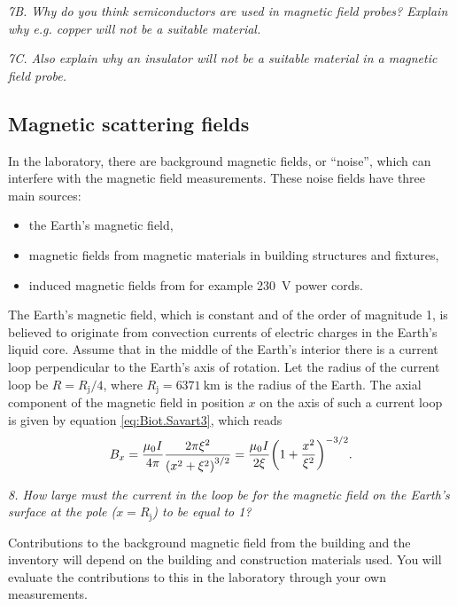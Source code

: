 \documentclass[../Elmag-labhefte-2020.tex]{subfiles}
\begin{document}
\emph{7B. Why do you think semiconductors are used in magnetic field probes? Explain why e.g. copper will not be a suitable material.}

\emph{7C. Also explain why an insulator will not be a suitable material in a magnetic field probe.}


\subsection{Magnetic scattering fields}

In the laboratory, there are background magnetic fields, or ``noise'', which can interfere with the magnetic field measurements.
These noise fields have three main sources:
\vspace{-4mm}
\begin{itemize}
    \item the Earth's magnetic field,
    \item magnetic fields from magnetic materials in building structures and fixtures,
    \item induced magnetic fields from for example \SI{230}{\volt} power cords.
\end{itemize}

The Earth's magnetic field, which is constant and of the order of magnitude \SI{1}{\gauss}, is believed to originate from convection currents of electric charges in the Earth's liquid core. Assume that in the middle of the Earth's interior there is a current loop perpendicular to the Earth's axis of rotation. Let the radius of the current loop be $R = R_\text{j}/4$, where $R_\text{j} = \SI{6371}{\km}$ is the radius of the Earth. The axial component of the magnetic field in position $x$ on the axis of such a current loop is given by equation \eqref{eq:Biot.Savart3}, which reads
\[
  B_x = \frac{\mu_0 I}{4 \pi} \frac{2\pi \xi^2}{\left( x^2 + \xi^2 \right)^{3/2}}
      = \frac{\mu_0 I}{2 \xi} \qty(1 + \frac{x^2}{\xi^2})^{-3/2}.
\]

\emph{8. How large must the current in the loop be for the magnetic field on the Earth's surface at the pole ($x = R_\text{j}$) to be equal to \SI{1}{\gauss}? }


Contributions to the background magnetic field from the building and the inventory will depend on the building and construction materials used. You will evaluate the contributions to this in the laboratory through your own measurements.
\end{document}
